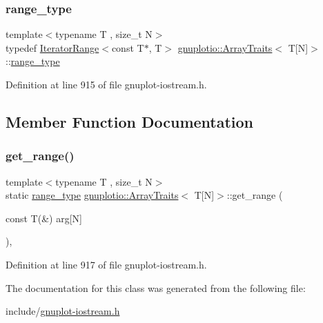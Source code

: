 \subsubsection{\texorpdfstring{range\+\_\+type}{range\_type}}
{\footnotesize\ttfamily template$<$typename T , size\+\_\+t N$>$ \\
typedef \hyperlink{classgnuplotio_1_1_iterator_range}{Iterator\+Range}$<$const T$\ast$, T$>$ \hyperlink{classgnuplotio_1_1_array_traits}{gnuplotio\+::\+Array\+Traits}$<$ T\mbox{[}N\mbox{]}$>$\+::\hyperlink{classgnuplotio_1_1_array_traits_3_01_t[_n]_4_a926f3c3d14fbe82aab7b70ccc16d20fb}{range\+\_\+type}}



Definition at line 915 of file gnuplot-\/iostream.\+h.



\subsection{Member Function Documentation}
\mbox{\label{classgnuplotio_1_1_array_traits_3_01_t[_n]_4_adc9c1ce6da4923418f367e08c150a928}} 
\subsubsection{\texorpdfstring{get\+\_\+range()}{get\_range()}}
{\footnotesize\ttfamily template$<$typename T , size\+\_\+t N$>$ \\
static \hyperlink{classgnuplotio_1_1_array_traits_3_01_t[_n]_4_a926f3c3d14fbe82aab7b70ccc16d20fb}{range\+\_\+type} \hyperlink{classgnuplotio_1_1_array_traits}{gnuplotio\+::\+Array\+Traits}$<$ T\mbox{[}N\mbox{]}$>$\+::get\+\_\+range (\begin{DoxyParamCaption}\item[{const T(\&)}]{arg\mbox{[}\+N\mbox{]} }\end{DoxyParamCaption})\hspace{0.3cm}{\ttfamily [inline]}, {\ttfamily [static]}}



Definition at line 917 of file gnuplot-\/iostream.\+h.



The documentation for this class was generated from the following file\+:\begin{DoxyCompactItemize}
\item 
include/\hyperlink{gnuplot-iostream_8h}{gnuplot-\/iostream.\+h}\end{DoxyCompactItemize}
